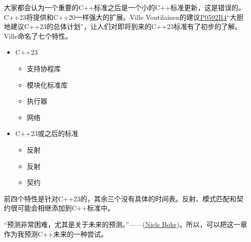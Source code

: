 大家都会认为一个重要的C++标准之后是一个小的C++标准更新，这是错误的。C++23将提供和C++20一样强大的扩展。Ville Voutilainen的建议\href{http://www.open-std.org/jtc1/sc22/wg21/docs/papers/2019/p0592r4.html}{P0592R4}“大胆地建议C++23的总体计划”，让人们对即将到来的C++23标准有了初步的了解。Ville命名了七个特性。

\begin{itemize}
\item 
C++23
\begin{itemize}
\item 
支持协程库

\item 
模块化标准库

\item 
执行器

\item 
网络
\end{itemize}

\item 
C++23或之后的标准
\begin{itemize}
\item 
反射

\item 
反射

\item 
契约
\end{itemize}
\end{itemize}

前四个特性是针对C++23的，其余三个没有具体的时间表。反射、模式匹配和契约很可能会相继添加到C++标准中。

“预测非常困难，尤其是关于未来的预测。”——(\href{https://www.goodreads.com/quotes/23796-prediction-is-very-difficult-especially-about-the-future}{Niels Bohr})。所以，可以把这一章作为我预测C++未来的一种尝试。















